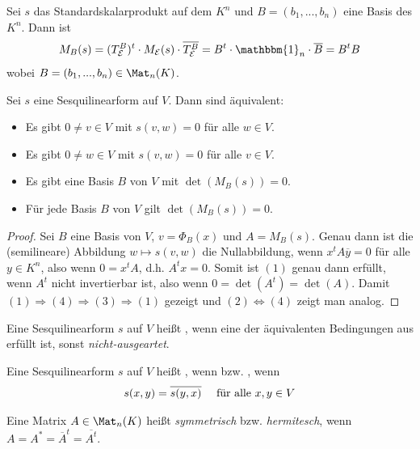 \begin{example}
	Sei $s$ das Standardskalarprodukt auf dem $K^n$ und $B=(b_1,...,b_n)$ eine Basis des $K^n$. Dann ist 
	\begin{align}
		M_B(s)=(T_{\mathcal{E}}^B)^t\cdot M_{\mathcal{E}}(s)\cdot \overline{T_{\mathcal{E}}^B}=B^t\cdot \mathbbm{1}_n\cdot \overline{B}=B^tB\notag
	\end{align}
	wobei $B=(b_1,...,b_n)\in\Mat_n(K)$.
\end{example}

\begin{proposition}
	Sei $s$ eine Sesquilinearform auf $V$. Dann sind äquivalent:
	\begin{itemize}
		\item Es gibt $0\neq v\in V$ mit $s(v,w)=0$ für alle $w\in V$.
		\item Es gibt $0\neq w\in V$ mit $s(v,w)=0$ für alle $v\in V$.
		\item Es gibt eine Basis $B$ von $V$ mit $\det(M_B(s))=0$.
		\item Für jede Basis $B$ von $V$ gilt $\det(M_B(s))=0$.
	\end{itemize}
\end{proposition}
\begin{proof}
	Sei $B$ eine Basis von $V$, $v=\Phi_B(x)$ und $A=M_B(s)$. Genau dann ist die (semilineare) Abbildung $w\mapsto s(v,w)$ die Nullabbildung, wenn $x^tA\overline{y}=0$ für alle $y\in K^n$, also wenn $0=x^tA$, d.h. $A^tx=0$. Somit ist $(1)$ genau dann erfüllt, wenn $A^t$ nicht invertierbar ist, also wenn $0=\det(A^t)=\det(A)$. Damit $(1)\Rightarrow (4)\Rightarrow (3)\Rightarrow (1)$ gezeigt und $(2)\iff (4)$ zeigt man analog.
\end{proof}

\begin{definition}[ausgeartet]
	Eine Sesquilinearform $s$ auf $V$ heißt , wenn eine der äquivalenten Bedingungen aus  erfüllt ist, sonst \emph{nicht-ausgeartet}.
\end{definition}

\begin{definition}
	Eine Sesquilinearform $s$ auf $V$ heißt , wenn bzw. , wenn
	\begin{align}
		s(x,y)=\overline{s(y,x)}\quad\text{ für alle }x,y\in V\notag
	\end{align}
	
	Eine Matrix $A\in\Mat_n(K)$ heißt \emph{symmetrisch} bzw. \emph{hermitesch}, wenn $A=A^*=\overline{A}^t=\overline{A^t}$.
\end{definition}

